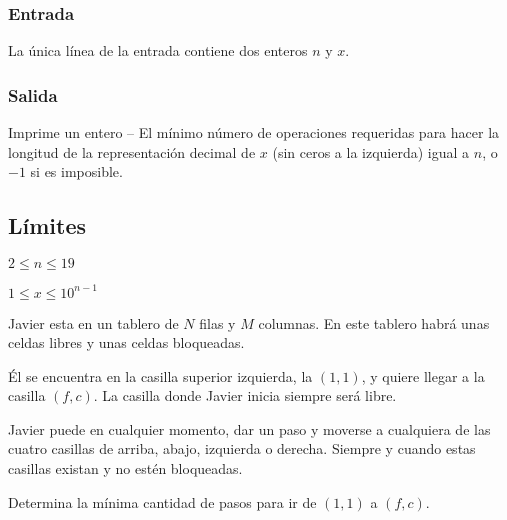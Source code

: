 \subsubsection*{Entrada}
La única línea de la entrada contiene dos enteros \(n\) y \(x\).

\subsubsection*{Salida}
Imprime un entero -- El mínimo número de operaciones requeridas para hacer la longitud de la representación decimal de \(x\) (sin ceros a la izquierda) igual a \(n\), o \(-1\) si es imposible.

\begin{casebox3}
\end{casebox3}
\subsection*{Límites}
\begin{plimits}
	\item \(2\leq n \leq 19\)
	\item \(1\leq x \leq 10^{n-1}\)
\end{plimits}
\codeforces


\problembreak

\problemtitle Javier esta en un tablero de \(N\) filas y \(M\) columnas. En este tablero habrá unas celdas libres y unas celdas bloqueadas.

Él se encuentra en la casilla superior izquierda, la \((1, 1)\), y quiere llegar a la casilla \((f,c)\). La casilla donde Javier inicia siempre será libre.

Javier puede en cualquier momento, dar un paso y moverse a cualquiera de las cuatro casillas de arriba, abajo, izquierda o derecha. Siempre y cuando estas casillas existan y no estén bloqueadas. 

Determina la mínima cantidad de pasos para ir de \((1, 1)\) a \((f,c)\).

